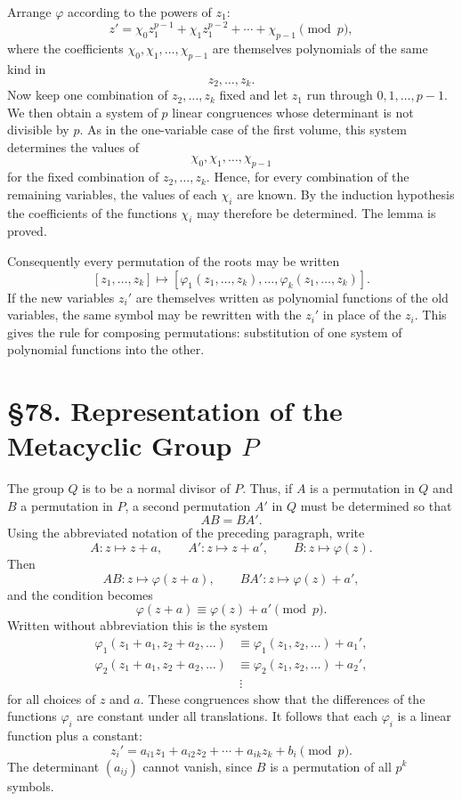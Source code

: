 \documentclass[11pt,a4paper]{book}
\newcommand{\webersection}[2]{\clearpage\section*{\S #1. #2}}
\begin{document}
Arrange \(\varphi\) according to the powers of \(z_1\):
\[
 z'=\chi_0 z_1^{p-1}+\chi_1 z_1^{p-2}+\cdots+\chi_{p-1}\pmod p,
\]
where the coefficients \(\chi_0,\chi_1,\ldots,\chi_{p-1}\) are themselves polynomials of the same kind in
\[
 z_2,\ldots,z_k.
\]
Now keep one combination of \(z_2,\ldots,z_k\) fixed and let \(z_1\) run through \(0,1,\ldots,p-1\).  We then obtain a system of \(p\) linear congruences whose determinant is not divisible by \(p\).  As in the one-variable case of the first volume, this system determines the values of
\[
 \chi_0,\chi_1,\ldots,\chi_{p-1}
\]
for the fixed combination of \(z_2,\ldots,z_k\).  Hence, for every combination of the remaining variables, the values of each \(\chi_i\) are known.  By the induction hypothesis the coefficients of the functions \(\chi_i\) may therefore be determined.  The lemma is proved.

Consequently every permutation of the roots may be written
\[
 [z_1,\ldots,z_k]\longmapsto
 [\varphi_1(z_1,\ldots,z_k),\ldots,\varphi_k(z_1,\ldots,z_k)].
\]
If the new variables \(z_i'\) are themselves written as polynomial functions of the old variables, the same symbol may be rewritten with the \(z_i'\) in place of the \(z_i\).  This gives the rule for composing permutations: substitution of one system of polynomial functions into the other.

\webersection{78}{Representation of the Metacyclic Group \(P\)}

The group \(Q\) is to be a normal divisor of \(P\).  Thus, if \(A\) is a permutation in \(Q\) and \(B\) a permutation in \(P\), a second permutation \(A'\) in \(Q\) must be determined so that
\[
 AB=BA'.
\]
Using the abbreviated notation of the preceding paragraph, write
\[
 A:z\mapsto z+a,\qquad
 A':z\mapsto z+a',\qquad
 B:z\mapsto \varphi(z).
\]
Then
\[
 AB:z\mapsto \varphi(z+a),\qquad
 BA':z\mapsto \varphi(z)+a',
\]
and the condition becomes
\[
 \varphi(z+a)\equiv \varphi(z)+a'\pmod p.
\]
Written without abbreviation this is the system
\[
\begin{aligned}
 \varphi_1(z_1+a_1,z_2+a_2,\ldots)
     &\equiv \varphi_1(z_1,z_2,\ldots)+a_1',\\
 \varphi_2(z_1+a_1,z_2+a_2,\ldots)
     &\equiv \varphi_2(z_1,z_2,\ldots)+a_2',\\
 &\ \vdots
\end{aligned}
\]
for all choices of \(z\) and \(a\).  These congruences show that the differences of the functions \(\varphi_i\) are constant under all translations.  It follows that each \(\varphi_i\) is a linear function plus a constant:
\[
 z_i'=a_{i1}z_1+a_{i2}z_2+\cdots+a_{ik}z_k+b_i\pmod p.
\]
The determinant \((a_{ij})\) cannot vanish, since \(B\) is a permutation of all \(p^k\) symbols.
\end{document}
